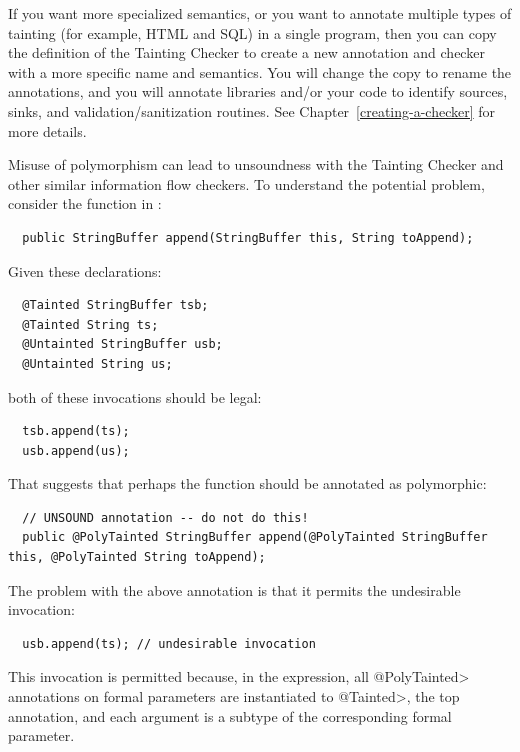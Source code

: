If you want more specialized semantics, or you want to annotate multiple
types of tainting (for example, HTML and SQL) in a single program,
then you can copy the definition of
the Tainting Checker to create a new annotation and checker with a more
specific name and semantics.  You will change the copy to rename the
annotations, and you will annotate libraries and/or your code to identify
sources, sinks, and validation/sanitization routines.
See Chapter~\ref{creating-a-checker} for more
details.



Misuse of polymorphism can lead to unsoundness with the Tainting Checker
and other similar information flow checkers. To understand the potential
problem, consider the  function in
:

\begin{Verbatim}
  public StringBuffer append(StringBuffer this, String toAppend);
\end{Verbatim}

Given these declarations:

\begin{Verbatim}
  @Tainted StringBuffer tsb;
  @Tainted String ts;
  @Untainted StringBuffer usb;
  @Untainted String us;
\end{Verbatim}

\noindent
both of these invocations should be legal:

\begin{Verbatim}
  tsb.append(ts);
  usb.append(us);
\end{Verbatim}

That suggests that perhaps the function should be annotated as polymorphic:

\begin{Verbatim}
  // UNSOUND annotation -- do not do this!
  public @PolyTainted StringBuffer append(@PolyTainted StringBuffer this, @PolyTainted String toAppend);
\end{Verbatim}

The problem with the above annotation is that it permits the undesirable
invocation:

\begin{Verbatim}
  usb.append(ts); // undesirable invocation
\end{Verbatim}

\noindent
This invocation is permitted because, in the expression, all
\<@PolyTainted> annotations on formal parameters are instantiated to
\<@Tainted>, the top annotation, and each argument is a subtype of the
corresponding formal parameter.

